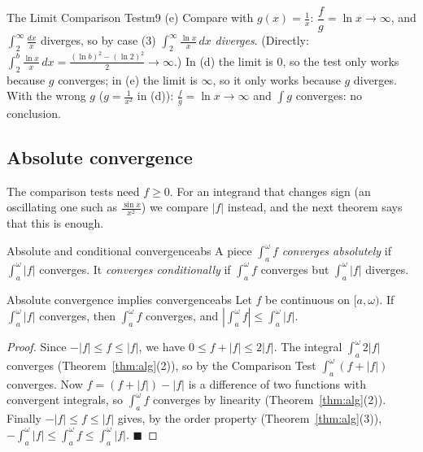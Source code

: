 \documentclass[11pt]{article}
\begin{document}
\begin{exmp}{The Limit Comparison Test}{m9}
(e) Compare with $g(x)=\frac1x$: $\dfrac fg=\ln x\to\infty$, and $\int_2^\infty\frac{dx}x$ diverges, so by case (3) $\int_2^\infty\frac{\ln x}x\,dx$ \emph{diverges}. (Directly: $\int_2^b\frac{\ln x}x\,dx=\frac{(\ln b)^2-(\ln2)^2}2\to\infty$.)
In (d) the limit is $0$, so the test only works because $g$ converges; in (e) the limit is $\infty$, so it only works because $g$ diverges. With the wrong $g$ ($g=\frac1{x^2}$ in (d)): $\frac fg=\ln x\to\infty$ and $\int g$ converges: no conclusion.
\end{exmp}

\subsection*{Absolute convergence}

The comparison tests need $f\ge0$. For an integrand that changes sign (an oscillating one such as $\frac{\sin x}{x^2}$) we compare $\lvert f\rvert$ instead, and the next theorem says that this is enough.

\begin{defn}{Absolute and conditional convergence}{abs}
A piece $\int_a^\omega f$ \emph{converges absolutely} if $\int_a^\omega\lvert f\rvert$ converges. It \emph{converges conditionally} if $\int_a^\omega f$ converges but $\int_a^\omega\lvert f\rvert$ diverges.
\end{defn}

\begin{thm}{Absolute convergence implies convergence}{abs}
Let $f$ be continuous on $[a,\omega)$. If $\int_a^\omega\lvert f\rvert$ converges, then $\int_a^\omega f$ converges, and $\left\lvert\int_a^\omega f\right\rvert\le\int_a^\omega\lvert f\rvert$.
\end{thm}
\begin{proof}
Since $-\lvert f\rvert\le f\le\lvert f\rvert$, we have $0\le f+\lvert f\rvert\le2\lvert f\rvert$. The integral $\int_a^\omega2\lvert f\rvert$ converges (Theorem~\ref{thm:alg}(2)), so by the Comparison Test $\int_a^\omega(f+\lvert f\rvert)$ converges. Now $f=(f+\lvert f\rvert)-\lvert f\rvert$ is a difference of two functions with convergent integrals, so $\int_a^\omega f$ converges by linearity (Theorem~\ref{thm:alg}(2)). Finally $-\lvert f\rvert\le f\le\lvert f\rvert$ gives, by the order property (Theorem~\ref{thm:alg}(3)), $-\int_a^\omega\lvert f\rvert\le\int_a^\omega f\le\int_a^\omega\lvert f\rvert$. $\blacksquare$
\end{proof}
\end{document}
